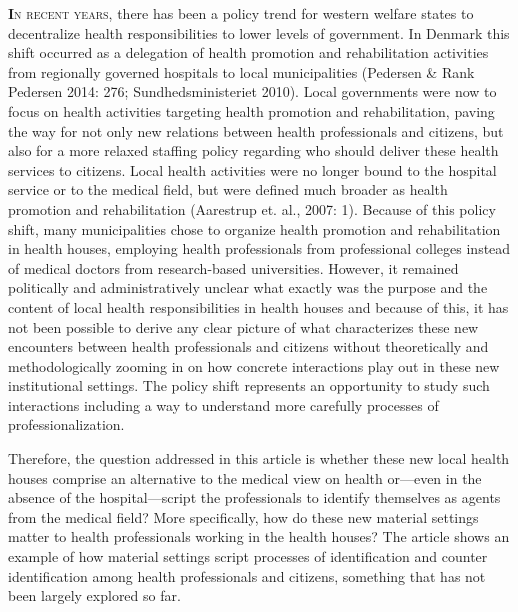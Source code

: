 
\lettrine[lines=2]{\bfseries\color{black}I}{n recent years}, there has been a policy trend for western welfare states to decentralize health responsibilities to lower levels of government. In Denmark this shift occurred as a delegation of health promotion and rehabilitation activities from regionally governed hospitals to local municipalities (Pedersen \& Rank Pedersen 2014: 276; Sundhedsministeriet 2010). Local governments were now to focus on health activities targeting health promotion and rehabilitation, paving the way for not only new relations between health professionals and citizens, but also for a more relaxed staffing policy regarding who should deliver these health services to citizens. Local health activities were no longer bound to the hospital service or to the medical field, but were defined much broader as health promotion and rehabilitation (Aarestrup et. al., 2007: 1). Because of this policy shift, many municipalities chose to organize health promotion and rehabilitation in health houses, employing health professionals from professional colleges instead of medical doctors from research-based universities. However, it remained politically and administratively unclear what exactly was the purpose and the content of local health responsibilities in health houses and because of this, it has not been possible to derive any clear picture of what characterizes these new encounters between health professionals and citizens without theoretically and methodologically zooming in on how concrete interactions play out in these new institutional settings. The policy shift represents an opportunity to study such interactions including a way to understand more carefully processes of professionalization. 
\par
Therefore, the question addressed in this article is whether these new local health houses comprise an alternative to the medical view on health or---even in the absence of the hospital---script the professionals to identify themselves as agents from the medical field? More specifically, how do these new material settings matter to health professionals working in the health houses? The article shows an example of how material settings script processes of identification and counter identification among health professionals and citizens, something that has not been largely explored so far.
